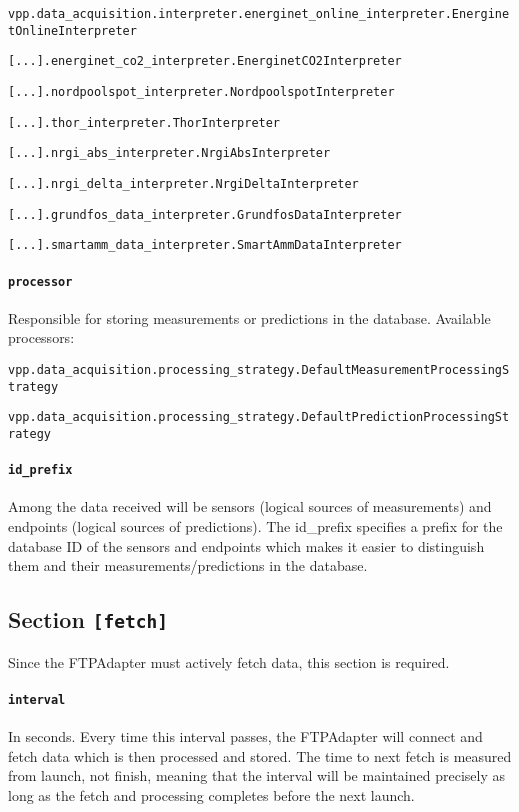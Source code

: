 {\texttt{vpp.data\_acquisition.interpreter.energinet\_online\_interpreter.EnerginetOnlineInterpreter}

\texttt{[...].energinet\_co2\_interpreter.EnerginetCO2Interpreter}

\texttt{[...].nordpoolspot\_interpreter.NordpoolspotInterpreter}

\texttt{[...].thor\_interpreter.ThorInterpreter}

\texttt{[...].nrgi\_abs\_interpreter.NrgiAbsInterpreter}

\texttt{[...].nrgi\_delta\_interpreter.NrgiDeltaInterpreter}

\texttt{[...].grundfos\_data\_interpreter.GrundfosDataInterpreter}

\texttt{[...].smartamm\_data\_interpreter.SmartAmmDataInterpreter}

\paragraph{\texttt{processor}} Responsible for storing measurements or predictions in the database. Available processors:

\texttt{vpp.data\_acquisition.processing\_strategy.DefaultMeasurementProcessingStrategy}

\texttt{vpp.data\_acquisition.processing\_strategy.DefaultPredictionProcessingStrategy}

\paragraph{\texttt{id\_prefix}} Among the data received will be sensors (logical sources of measurements) and endpoints (logical sources of predictions). The id\_prefix specifies a prefix for the database ID of the sensors and endpoints which makes it easier to distinguish them and their measurements/predictions in the database.


\subsection{Section \texttt{[fetch]}}
Since the FTPAdapter must actively fetch data, this section is required. 

\paragraph{\texttt{interval}} In seconds. Every time this interval passes, the FTPAdapter will connect  and fetch data which is then processed and stored. The time to next fetch is measured from launch, not finish, meaning that the interval will be maintained precisely as long as the fetch and processing completes before the next launch.

}
